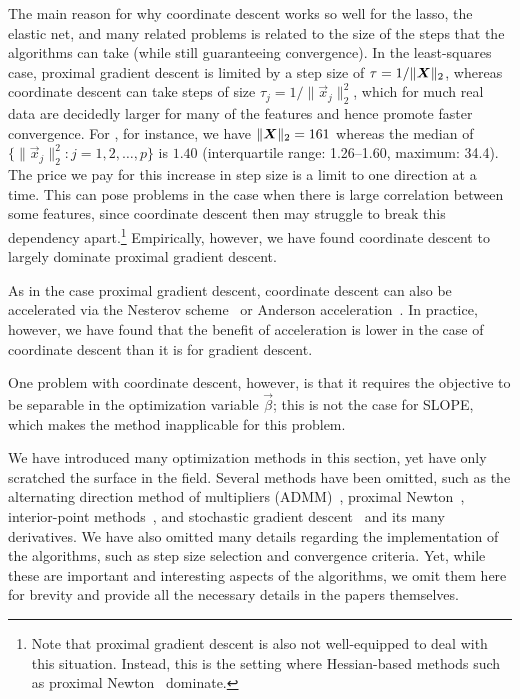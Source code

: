 The main reason for why coordinate descent works so well for the lasso, the elastic net, and many related problems is related to the size of the steps that the algorithms can take (while still guaranteeing convergence). In the least-squares case, proximal gradient descent is limited by a step size of \(\tau = 1/\lVert \boldsymbol{X}\rVert_2\), whereas coordinate descent can take steps of size \(\tau_j =1/\lVert \vec{x}_j \rVert_2^2\), which for much real data are decidedly larger for many of the features and hence promote faster convergence. For , for instance, we have \(\lVert \boldsymbol{X}\rVert_2 = 161\) whereas the median of \(\{\lVert \vec{x}_j\rVert_2^2 : j = 1,2,\dots,p\}\) is \(1.40\) (interquartile range: 1.26--1.60, maximum: 34.4). The price we pay for this increase in step size is a limit to one direction at a time. This can pose problems in the case when there is large correlation between some features, since coordinate descent then may struggle to break this dependency apart.\footnote{Note that proximal gradient descent is also not well-equipped to deal with this situation. Instead, this is the setting where Hessian-based methods such as proximal Newton~\parencite{lee2014} dominate.} Empirically, however, we have found coordinate descent to largely dominate proximal gradient descent.

As in the case proximal gradient descent, coordinate descent can also be accelerated via the Nesterov scheme~\parencite{nesterov1983} or Anderson acceleration~\parencite{bertrand2021}. In practice, however, we have found that the benefit of acceleration is lower in the case of coordinate descent than it is for gradient descent.

One problem with coordinate descent, however, is that it requires the objective to be separable in the optimization variable \(\vec{\beta}\); this is not the case for SLOPE, which makes the method inapplicable for this problem.

We have introduced many optimization methods in this section, yet have only scratched the surface in the field. Several methods have been omitted, such as the alternating direction method of multipliers (ADMM)~\parencite{boyd2010}, proximal Newton~\parencite{lee2014}, interior-point methods~\parencite{kim2007}, and stochastic gradient descent~\parencite{robbins1951,bottou2010} and its many derivatives. We have also omitted many details regarding the implementation of the algorithms, such as step size selection and convergence criteria. Yet, while these are important and interesting aspects of the algorithms, we omit them here for brevity and provide all the necessary details in the papers themselves.


